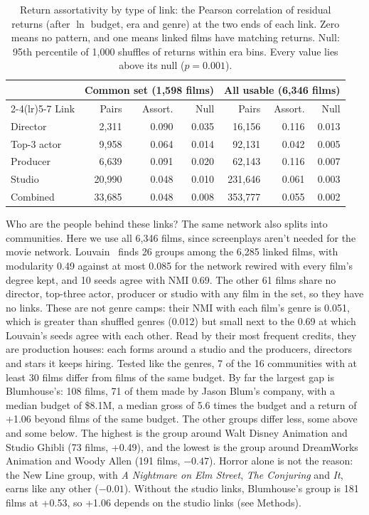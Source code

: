 \documentclass[9pt,twocolumn,twoside]{pnas-new}
\begin{document}
\begin{table}
\centering
\caption{Return assortativity by type of link: the Pearson correlation of residual returns (after $\ln$ budget, era and genre) at the two ends of each link. Zero means no pattern, and one means linked films have matching returns. Null: 95th percentile of 1,000 shuffles of returns within era bins. Every value lies above its null ($p=0.001$).}
\label{tab:assortativity}
\small
\setlength{\tabcolsep}{3pt}
\begin{tabular}{lrrrrrr}
\toprule
 & \multicolumn{3}{c}{Common set (1,598 films)} & \multicolumn{3}{c}{All usable (6,346 films)} \\
\cmidrule(lr){2-4}\cmidrule(lr){5-7}
Link & Pairs & Assort. & Null & Pairs & Assort. & Null \\
\midrule
Director & 2,311 & 0.090 & 0.035 & 16,156 & 0.116 & 0.013 \\
Top-3 actor & 9,958 & 0.064 & 0.014 & 92,131 & 0.042 & 0.005 \\
Producer & 6,639 & 0.091 & 0.020 & 62,143 & 0.116 & 0.007 \\
Studio & 20,990 & 0.048 & 0.010 & 231,646 & 0.061 & 0.003 \\
Combined & 33,685 & 0.048 & 0.008 & 353,777 & 0.055 & 0.002 \\
\bottomrule
\end{tabular}
\end{table}

Who are the people behind these links? The same network also splits into communities. Here we use all 6,346 films, since screenplays aren't needed for the movie network. Louvain~\cite{blondel2008fast} finds 26 groups among the 6,285 linked films, with modularity 0.49 against at most 0.085 for the network rewired with every film's degree kept, and 10 seeds agree with NMI 0.69. The other 61 films share no director, top-three actor, producer or studio with any film in the set, so they have no links. These are not genre camps: their NMI with each film's genre is 0.051, which is greater than shuffled genres (0.012) but small next to the 0.69 at which Louvain's seeds agree with each other. Read by their most frequent credits, they are production houses: each forms around a studio and the producers, directors and stars it keeps hiring. Tested like the genres, 7 of the 16 communities with at least 30 films differ from films of the same budget. By far the largest gap is Blumhouse's: 108 films, 71 of them made by Jason Blum's company, with a median budget of \$8.1M, a median gross of 5.6 times the budget and a return of +1.06 beyond films of the same budget. The other groups differ less, some above and some below. The highest is the group around Walt Disney Animation and Studio Ghibli (73 films, +0.49), and the lowest is the group around DreamWorks Animation and Woody Allen (191 films, $-0.47$). Horror alone is not the reason: the New Line group, with \emph{A Nightmare on Elm Street}, \emph{The Conjuring} and \emph{It}, earns like any other ($-0.01$). Without the studio links, Blumhouse's group is 181 films at +0.53, so +1.06 depends on the studio links (see Methods).
\end{document}

